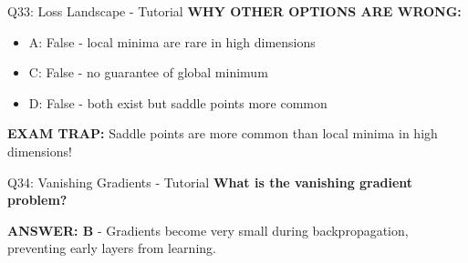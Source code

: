 \documentclass[8pt]{beamer}
\begin{document}
\begin{frame}{Q33: Loss Landscape - Tutorial}
		\vspace{0.05cm}
		\textcolor{myred}{\textbf{WHY OTHER OPTIONS ARE WRONG:}}
		\begin{itemize}
			\item \textcolor{myred}{A:} False - local minima are rare in high dimensions
			\item \textcolor{myred}{C:} False - no guarantee of global minimum
			\item \textcolor{myred}{D:} False - both exist but saddle points more common
		\end{itemize}
		
		\textcolor{myred}{\textbf{EXAM TRAP:}} Saddle points are \textcolor{myblue}{more common} than local minima in high dimensions!
	\end{frame}
	
	\begin{frame}{Q34: Vanishing Gradients - Tutorial}
		\fontsize{6.5}{7.5}\selectfont
		\textbf{What is the vanishing gradient problem?}
		
		\vspace{0.05cm}
		\textcolor{myblue}{\textbf{ANSWER: B}} - Gradients become very small during backpropagation, preventing early layers from learning.
		

\end{frame}
\end{document}
